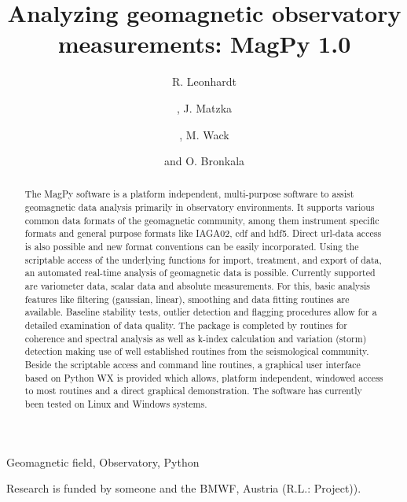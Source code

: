 \documentclass{elsart}
\begin{document}
\begin{frontmatter}


\title{Analyzing geomagnetic observatory measurements: MagPy 1.0}

\author[ZAMG]{R. Leonhardt}
\author[DTU]{, J. Matzka}
\author[LMU]{, M. Wack}
\author[GFZ]{and O. Bronkala}

\address[ZAMG]{Conrad Observatory, Zentralanstalt f\"ur Meteorologie und Geodynamik, Vienna, Austria}
\address[DTU]{National Space Institute (DTU Space), Technical University of Denmark, Copenhagen, Denmark}
\address[LMU]{Department Geowissenschaften, Ludwig-Maximilians-Universit\"at, Munich, Germany}
\address[GFZ]{Observatory, GFZ Potsdam, Niemegk, Germany}


\begin{abstract}
The MagPy software is a platform independent, multi-purpose software to assist geomagnetic data analysis primarily in observatory environments. It supports various common data formats of the geomagnetic community, among them instrument specific formats and general purpose formats like IAGA02, cdf and hdf5. Direct url-data access is also possible and new format conventions can be easily incorporated. Using the scriptable access of the underlying functions for import,  treatment, and export of data, an automated real-time analysis of geomagnetic data is possible. Currently supported are variometer data, scalar data and absolute measurements. For this, basic analysis features like filtering (gaussian, linear), smoothing and data fitting routines are available. Baseline stability tests, outlier detection and flagging procedures allow for a detailed examination of data quality. The package is completed by routines for coherence and spectral analysis as well as k-index calculation and variation (storm) detection making use of well established routines from the seismological community. Beside the scriptable access and command line routines, a graphical user interface based on Python WX is provided which allows, platform independent, windowed access to most routines and a direct graphical demonstration. The software has currently been tested on Linux and Windows systems.
\end{abstract}

\begin{keyword}
Geomagnetic field, Observatory, Python
\end{keyword}
\end{frontmatter}



\begin{ack}
Research is funded by someone and the BMWF, Austria (R.L.: Project)).
\end{ack}

{}
%

%
%
\end{document}

